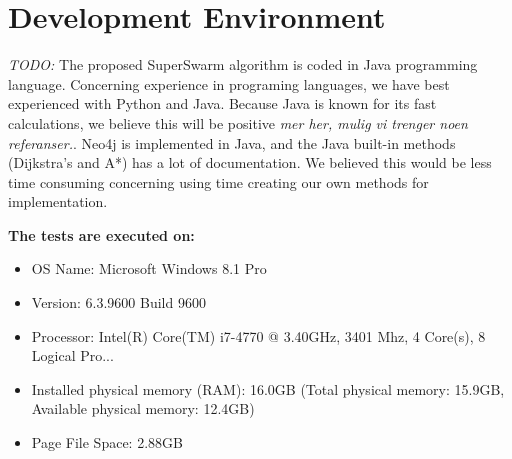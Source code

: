\section{Development Environment}


\emph{\color{red}TODO:} The proposed SuperSwarm algorithm is coded in Java programming language.  Concerning experience in programing languages, we have best experienced with Python and Java. Because Java is known for its fast calculations, we believe this will be positive \emph{\color{red} mer her, mulig vi trenger noen referanser.}. Neo4j is implemented in Java, and the Java built-in methods (Dijkstra's and A*) has a lot of documentation. We believed this would be less time consuming  concerning using time creating our own methods for implementation. 



\textbf{The tests are executed on: }

\begin{itemize}
\item OS Name: Microsoft Windows 8.1 Pro
\item Version: 6.3.9600 Build 9600
\item Processor: Intel(R) Core(TM) i7-4770 @ 3.40GHz, 3401 Mhz, 4 Core(s), 8 Logical Pro...
\item Installed physical memory (RAM): 16.0GB (Total physical memory: 15.9GB, Available physical memory: 12.4GB)
\item Page File Space: 2.88GB
\end{itemize}